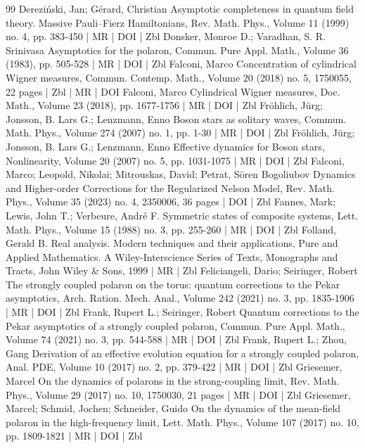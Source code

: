 \begin{thebibliography}{99}
 Dereziński, Jan; Gérard, Christian Asymptotic completeness in quantum field theory. Massive Pauli–Fierz Hamiltonians, Rev. Math. Phys., Volume 11 (1999) no. 4, pp. 383-450 | MR | DOI | Zbl
 Donsker, Monroe D.; Varadhan, S. R. Srinivasa Asymptotics for the polaron, Commun. Pure Appl. Math., Volume 36 (1983), pp. 505-528 | MR | DOI | Zbl
 Falconi, Marco Concentration of cylindrical Wigner measures, Commun. Contemp. Math., Volume 20 (2018) no. 5, 1750055, 22 pages | Zbl | MR | DOI
 Falconi, Marco Cylindrical Wigner measures, Doc. Math., Volume 23 (2018), pp. 1677-1756 | MR | DOI | Zbl
 Fröhlich, Jürg; Jonsson, B. Lars G.; Lenzmann, Enno Boson stars as solitary waves, Commun. Math. Phys., Volume 274 (2007) no. 1, pp. 1-30 | MR | DOI | Zbl
 Fröhlich, Jürg; Jonsson, B. Lars G.; Lenzmann, Enno Effective dynamics for Boson stars, Nonlinearity, Volume 20 (2007) no. 5, pp. 1031-1075 | MR | DOI | Zbl
 Falconi, Marco; Leopold, Nikolai; Mitrouskas, David; Petrat, Sören Bogoliubov Dynamics and Higher-order Corrections for the Regularized Nelson Model, Rev. Math. Phys., Volume 35 (2023) no. 4, 2350006, 36 pages | DOI | Zbl
 Fannes, Mark; Lewis, John T.; Verbeure, André F. Symmetric states of composite systems, Lett. Math. Phys., Volume 15 (1988) no. 3, pp. 255-260 | MR | DOI | Zbl
 Folland, Gerald B. Real analysis. Modern techniques and their applications, Pure and Applied Mathematics. A Wiley-Interscience Series of Texts, Monographs and Tracts, John Wiley \& Sons, 1999 | MR | Zbl
 Feliciangeli, Dario; Seiringer, Robert The strongly coupled polaron on the torus: quantum corrections to the Pekar asymptotics, Arch. Ration. Mech. Anal., Volume 242 (2021) no. 3, pp. 1835-1906 | MR | DOI | Zbl
 Frank, Rupert L.; Seiringer, Robert Quantum corrections to the Pekar asymptotics of a strongly coupled polaron, Commun. Pure Appl. Math., Volume 74 (2021) no. 3, pp. 544-588 | MR | DOI | Zbl
 Frank, Rupert L.; Zhou, Gang Derivation of an effective evolution equation for a strongly coupled polaron, Anal. PDE, Volume 10 (2017) no. 2, pp. 379-422 | MR | DOI | Zbl
 Griesemer, Marcel On the dynamics of polarons in the strong-coupling limit, Rev. Math. Phys., Volume 29 (2017) no. 10, 1750030, 21 pages | MR | DOI | Zbl
 Griesemer, Marcel; Schmid, Jochen; Schneider, Guido On the dynamics of the mean-field polaron in the high-frequency limit, Lett. Math. Phys., Volume 107 (2017) no. 10, pp. 1809-1821 | MR | DOI | Zbl

\end{thebibliography}
